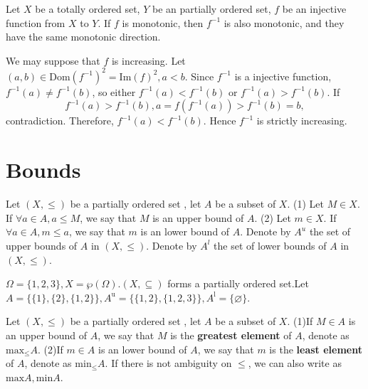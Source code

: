 \begin{propositionenv}
    Let $X$ be a totally ordered set,  $Y$ be an partially ordered set,  $f$ be an injective function from $X$ to $Y$. If $f$ is monotonic,  then $f^{-1}$ is also monotonic,  and they have the same monotonic direction.
\end{propositionenv}
\begin{proofenv}
    We may suppose that $f$ is increasing.
    Let $(a, b)\in \mathrm{Dom}(f^{-1})^2=\mathrm{Im}(f)^2, a<b$. Since $f^{-1}$ is a injective function,  $f^{-1}(a)\not =f^{-1}(b)$,  so either $f^{-1}(a)<f^{-1}(b)$ or $f^{-1}(a)>f^{-1}(b)$. If $$f^{-1}(a)>f^{-1}(b), a=f(f^{-1}(a))>f^{-1}(b)=b, $$ contradiction. Therefore,  $f^{-1}(a)<f^{-1}(b)$. Hence $f^{-1}$ is strictly increasing.
\end{proofenv}
\section{Bounds}
\begin{definitionenv}
    Let $(X, \le)$ be a partially ordered set , let $A$ be a subset of $X$.
    \newline
    (1) Let $M\in X$. If $\forall a \in A , a\le M$,  we say that $M$ is an upper bound of $A$. 
    \newline
    (2) Let $m\in X$. If $\forall a \in A , m\le a$,  we say that $m$ is an lower bound of $A$. 
    \newline
    Denote by $A^u$ the set of upper bounds of $A$ in $(X, \le)$.
    \newline
     Denote by $A^l$ the set of lower bounds of $A$ in $(X, \le)$.

\end{definitionenv}
\begin{exampleenv}
    $\Omega=\{1, 2, 3\}, X=\wp (\Omega).(X, \subseteq)$ forms a partially ordered set.Let $A=\{\{1\}, \{2\}, \{1, 2\}\}, A^\mathrm{u}=\{\{1, 2\}, \{1, 2, 3\}\}, A^\mathrm{l}=\{\varnothing\}$.
\end{exampleenv}
\begin{definitionenv}
    Let $(X, \le)$ be a partially ordered set , let $A$ be a subset of $X$.
    \newline
    (1)If $M \in A$ is an upper bound of $A$,  we say that $M$ is the \textbf{greatest element} of $A$,  denote as $\mathrm{max}_\le A$.
    \newline
    (2)If $m \in A$ is an lower bound of $A$,  we say that $m$ is the \textbf{least element} of $A$,  denote as $\mathrm{min}_\le A$.
    \newline
    If there is not ambiguity on $\le$, we can also write as $\mathrm{max}A, \mathrm{min}A$.
\end{definitionenv}
